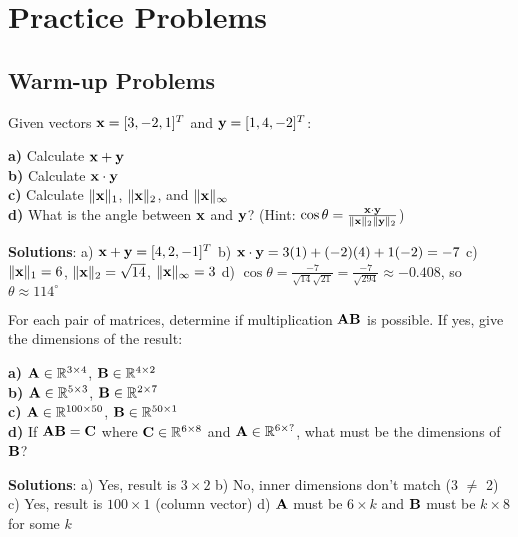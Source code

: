 \documentclass{article}
\newcounter{exercise}
\begin{document}
\section{Practice Problems}

\subsection{Warm-up Problems}

\begin{tcolorbox}[colback=gray!5!white,colframe=gray!75!black,title=Problem \stepcounter{exercise}\#\theexercise: Basic Vector Operations]
Given vectors $\mathbf{x} = [3, -2, 1]^T$ and $\mathbf{y} = [1, 4, -2]^T$:

\textbf{a)} Calculate $\mathbf{x} + \mathbf{y}$\\
\textbf{b)} Calculate $\mathbf{x} \cdot \mathbf{y}$\\
\textbf{c)} Calculate $\|\mathbf{x}\|_1$, $\|\mathbf{x}\|_2$, and $\|\mathbf{x}\|_\infty$\\
\textbf{d)} What is the angle between $\mathbf{x}$ and $\mathbf{y}$? (Hint: $\cos \theta = \frac{\mathbf{x} \cdot \mathbf{y}}{\|\mathbf{x}\|_2 \|\mathbf{y}\|_2}$)

\textbf{Solutions}:
a) $\mathbf{x} + \mathbf{y} = [4, 2, -1]^T$
b) $\mathbf{x} \cdot \mathbf{y} = 3(1) + (-2)(4) + 1(-2) = -7$
c) $\|\mathbf{x}\|_1 = 6$, $\|\mathbf{x}\|_2 = \sqrt{14}$, $\|\mathbf{x}\|_\infty = 3$
d) $\cos \theta = \frac{-7}{\sqrt{14}\sqrt{21}} = \frac{-7}{\sqrt{294}} \approx -0.408$, so $\theta \approx 114^\circ$
\end{tcolorbox}

\begin{tcolorbox}[colback=gray!5!white,colframe=gray!75!black,title=Problem \stepcounter{exercise}\#\theexercise: Matrix Multiplication Dimensions]
For each pair of matrices, determine if multiplication $\mathbf{A}\mathbf{B}$ is possible. If yes, give the dimensions of the result:

\textbf{a)} $\mathbf{A} \in \mathbb{R}^{3 \times 4}$, $\mathbf{B} \in \mathbb{R}^{4 \times 2}$\\
\textbf{b)} $\mathbf{A} \in \mathbb{R}^{5 \times 3}$, $\mathbf{B} \in \mathbb{R}^{2 \times 7}$\\
\textbf{c)} $\mathbf{A} \in \mathbb{R}^{100 \times 50}$, $\mathbf{B} \in \mathbb{R}^{50 \times 1}$\\
\textbf{d)} If $\mathbf{A}\mathbf{B} = \mathbf{C}$ where $\mathbf{C} \in \mathbb{R}^{6 \times 8}$ and $\mathbf{A} \in \mathbb{R}^{6 \times ?}$, what must be the dimensions of $\mathbf{B}$?

\textbf{Solutions}:
a) Yes, result is $3 \times 2$
b) No, inner dimensions don't match (3 $\neq$ 2)
c) Yes, result is $100 \times 1$ (column vector)
d) $\mathbf{A}$ must be $6 \times k$ and $\mathbf{B}$ must be $k \times 8$ for some $k$
\end{tcolorbox}
\end{document}
